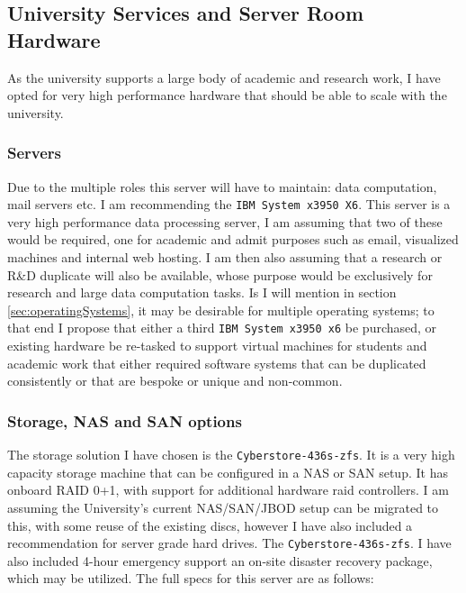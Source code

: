 \documentclass[10pt]{article}
\begin{document}
        \subsection{University Services and Server Room Hardware}
            As the university supports a large body of academic and research work, I have opted for very high performance hardware that should be able to scale with the university.

            \subsubsection{Servers}
                Due to the multiple roles this server will have to maintain: data computation, mail servers etc. I am recommending the \texttt{IBM System x3950 X6}\cite{cite:ibmx3950x6}. This server is a very high performance data processing server, I am assuming that two of these would be required, one for academic and admit purposes such as email, visualized machines and internal web hosting. I am then also assuming that a research or R\&D duplicate will also be available, whose purpose would be exclusively for research and large data computation tasks.
                Is I will mention in section \ref{sec:operatingSystems}, it may be desirable for multiple operating systems; to that end I propose that either a third \texttt{IBM System x3950 x6} be purchased, or existing hardware be re-tasked to support virtual machines for students and academic work that either required software systems that can be duplicated consistently or that are bespoke or unique and non-common.

            \subsubsection{Storage, NAS and SAN options}
                The storage solution I have chosen is the \texttt{Cyberstore-436s-zfs}\cite{cite:nexenta-NAS-cyberstore}. It is a very high capacity storage machine that can be configured in a NAS or SAN setup. It has onboard RAID 0+1, with support for additional hardware raid controllers. I am assuming the University's current NAS/SAN/JBOD setup can be migrated to this, with some reuse of the existing discs, however I have also included a recommendation for server grade hard drives. The \texttt{Cyberstore-436s-zfs}. I have also included 4-hour emergency support an on-site disaster recovery package, which may be utilized. The full specs for this server are as follows: 
\end{document}
